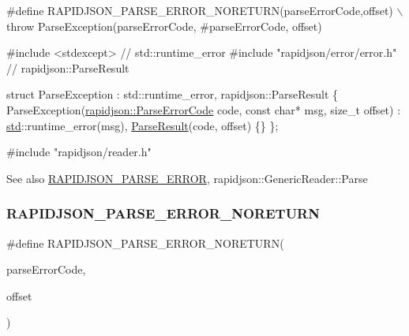 \begin{DoxyCode}
\textcolor{preprocessor}{#define RAPIDJSON\_PARSE\_ERROR\_NORETURN(parseErrorCode,offset) \(\backslash\)}
\textcolor{preprocessor}{   throw ParseException(parseErrorCode, #parseErrorCode, offset)}

\textcolor{preprocessor}{#include <stdexcept>}               \textcolor{comment}{// std::runtime\_error}
\textcolor{preprocessor}{#include "rapidjson/error/error.h"} \textcolor{comment}{// rapidjson::ParseResult}

\textcolor{keyword}{struct }ParseException : std::runtime\_error, rapidjson::ParseResult \{
  ParseException(\hyperlink{group__RAPIDJSON__ERRORS_ga8d4b32dfc45840bca189ade2bbcb6ba7}{rapidjson::ParseErrorCode} code, \textcolor{keyword}{const} \textcolor{keywordtype}{char}* msg, \textcolor{keywordtype}{size\_t} offset)
    : \hyperlink{namespacestd}{std}::runtime\_error(msg), \hyperlink{structParseResult}{ParseResult}(code, offset) \{\}
\};

\textcolor{preprocessor}{#include "rapidjson/reader.h"}
\end{DoxyCode}


\begin{DoxySeeAlso}{See also}
\hyperlink{group__RAPIDJSON__ERRORS_gae3689840fa6e89a241313f33b602f865}{R\+A\+P\+I\+D\+J\+S\+O\+N\+\_\+\+P\+A\+R\+S\+E\+\_\+\+E\+R\+R\+OR}, rapidjson\+::\+Generic\+Reader\+::\+Parse 
\end{DoxySeeAlso}
\mbox{\label{group__RAPIDJSON__ERRORS_ga7f8c4265b2edda78568ae3338aaf1461}} 
\subsubsection{\texorpdfstring{R\+A\+P\+I\+D\+J\+S\+O\+N\+\_\+\+P\+A\+R\+S\+E\+\_\+\+E\+R\+R\+O\+R\+\_\+\+N\+O\+R\+E\+T\+U\+RN}{RAPIDJSON\_PARSE\_ERROR\_NORETURN}\hspace{0.1cm}{\footnotesize\ttfamily [2/2]}}
{\footnotesize\ttfamily \#define R\+A\+P\+I\+D\+J\+S\+O\+N\+\_\+\+P\+A\+R\+S\+E\+\_\+\+E\+R\+R\+O\+R\+\_\+\+N\+O\+R\+E\+T\+U\+RN(\begin{DoxyParamCaption}\item[{}]{parse\+Error\+Code,  }\item[{}]{offset }\end{DoxyParamCaption})}

